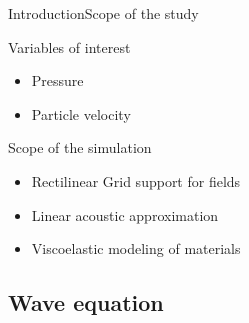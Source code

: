 \documentclass[9pt, xcolor={usenames, dvipsnames}]{beamer}
\begin{document}
				\begin{frame}{Introduction}{Scope of the study}
					\centering
					\begin{minipage}{0.6\textwidth}
						\begin{block}{Variables of interest}
							\begin{itemize}
								\item Pressure
								\item Particle velocity
							\end{itemize}
						\end{block}
						\begin{block}{Scope of the simulation}
							\begin{itemize}
								\item Rectilinear Grid support for fields
								\item Linear acoustic approximation
								\item Viscoelastic modeling of materials
							\end{itemize}
						\end{block}
					\end{minipage}
				\end{frame}

			\subsection{Wave equation}
\end{document}

